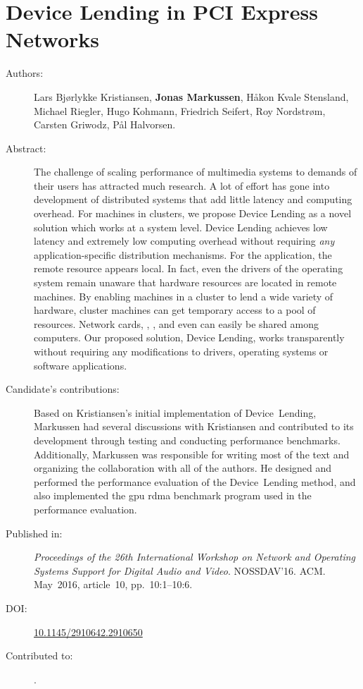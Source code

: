 \chapter{Device Lending in PCI Express Networks}
\label{paper:nossdav}
\paperthumb

\begin{description}
	\item[Authors:]
		Lars Bj{\o}rlykke Kristiansen, \textbf{Jonas Markussen}, H{\aa}kon Kvale Stensland,
		Michael Riegler, Hugo Kohmann, Friedrich Seifert, Roy Nordstr{\o}m, Carsten Griwodz, P{\aa}l Halvorsen.

	\item[Abstract:]
		The challenge of scaling  performance of multimedia systems to demands
		of their users has attracted much research.
		A lot of effort has gone into
		development of distributed systems that add little latency and computing overhead.
		For machines in  clusters,
		we propose Device Lending as a novel solution which works at a system
		level.
		Device Lending achieves low latency and extremely low computing overhead without
		requiring \textit{any} application-specific distribution mechanisms.
		For the application, the remote  resource appears local.
		In fact, even the drivers of the operating system remain unaware that
		hardware resources are located in remote machines.
		By enabling machines in a  cluster to lend a wide variety of hardware, 
		cluster machines can get temporary access to a pool of  resources. 
		Network cards, , , and even  can easily 
		be shared among computers.
		Our proposed solution, Device Lending, works transparently without requiring any modifications to drivers,
		operating systems or software applications.

	\item[Candidate's contributions:]
		Based on Kristiansen's initial implementation of Device~Lending, Markussen had several discussions with Kristiansen and contributed to its development through testing and conducting performance benchmarks.
		Additionally, Markussen was responsible for writing most of the text and organizing the collaboration with all of the authors.
		He designed and performed the performance evaluation of the Device~Lending method, and also implemented the \gls{gpu} \gls{rdma} benchmark program used in the performance evaluation.
		

	\item[Published in:]
		\emph{Proceedings of the 26th International Workshop on Network and Operating Systems Support for Digital Audio and Video}.
		NOSSDAV'16. ACM.
		May~2016, article~10, pp.~10:1--10:6.

	\item[DOI:] \href{https://doi.org/10.1145/2910642.2910650}{10.1145/2910642.2910650}

	\item[Contributed to:]
		.

\end{description}

